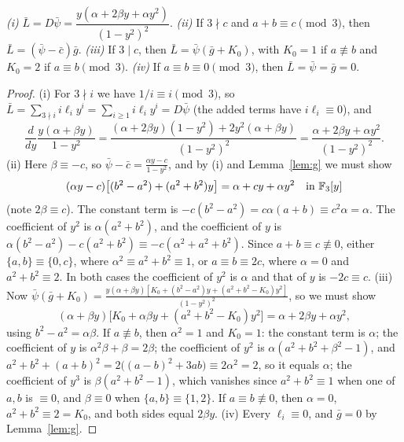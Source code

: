 \documentclass[11pt]{amsart}
\begin{document}
\begin{lemma}\label{lem:F3id}
\emph{(i)} $\bar L=D\bar\psi=\dfrac{y(\alpha+2\beta y+\alpha y^2)}{(1-y^2)^2}$.
\emph{(ii)} If $3\nmid c$ and $a+b\equiv c\pmod3$, then $\bar L=(\bar\psi-\bar c)\bar g$.
\emph{(iii)} If $3\mid c$, then $\bar L=\bar\psi(\bar g+K_0)$, with $K_0=1$ if $a\not\equiv b$ and $K_0=2$ if $a\equiv b\pmod 3$.
\emph{(iv)} If $a\equiv b\equiv0\pmod3$, then $\bar L=\bar\psi=\bar g=0$.
\end{lemma}
\begin{proof}
(i) For $3\nmid i$ we have $1/i\equiv i\pmod3$, so $\bar L=\sum_{3\nmid i}i\ell_iy^i=\sum_{i\ge1}i\ell_iy^i=D\bar\psi$ (the added terms have $i\ell_i\equiv0$), and
\[ \frac d{dy}\frac{y(\alpha+\beta y)}{1-y^2}=\frac{(\alpha+2\beta y)(1-y^2)+2y^2(\alpha+\beta y)}{(1-y^2)^2}=\frac{\alpha+2\beta y+\alpha y^2}{(1-y^2)^2}. \]
(ii) Here $\beta\equiv-c$, so $\bar\psi-\bar c=\frac{\alpha y-c}{1-y^2}$, and by (i) and Lemma~\ref{lem:g} we must show
\[ (\alpha y-c)\bigl[(b^2-a^2)+(a^2+b^2)y\bigr]=\alpha+cy+\alpha y^2\quad\text{in }\mathbb{F}_3[y] \]
(note $2\beta\equiv c$). The constant term is $-c(b^2-a^2)=c\alpha(a+b)\equiv c^2\alpha=\alpha$. The coefficient of $y^2$ is $\alpha(a^2+b^2)$, and the coefficient of $y$ is $\alpha(b^2-a^2)-c(a^2+b^2)\equiv-c(\alpha^2+a^2+b^2)$. Since $a+b\equiv c\not\equiv0$, either $\{a,b\}\equiv\{0,c\}$, where $\alpha^2\equiv a^2+b^2\equiv1$, or $a\equiv b\equiv2c$, where $\alpha=0$ and $a^2+b^2\equiv2$. In both cases the coefficient of $y^2$ is $\alpha$ and that of $y$ is $-2c\equiv c$.
(iii) Now $\bar\psi(\bar g+K_0)=\frac{y(\alpha+\beta y)[K_0+(b^2-a^2)y+(a^2+b^2-K_0)y^2]}{(1-y^2)^2}$, so we must show
\[ (\alpha+\beta y)\bigl[K_0+\alpha\beta y+(a^2+b^2-K_0)y^2\bigr]=\alpha+2\beta y+\alpha y^2, \]
using $b^2-a^2=\alpha\beta$. If $a\not\equiv b$, then $\alpha^2=1$ and $K_0=1$: the constant term is $\alpha$; the coefficient of $y$ is $\alpha^2\beta+\beta=2\beta$; the coefficient of $y^2$ is $\alpha(a^2+b^2+\beta^2-1)$, and $a^2+b^2+(a+b)^2=2\bigl((a-b)^2+3ab\bigr)\equiv2\alpha^2=2$, so it equals $\alpha$; the coefficient of $y^3$ is $\beta(a^2+b^2-1)$, which vanishes since $a^2+b^2\equiv1$ when one of $a,b$ is $\equiv0$, and $\beta\equiv0$ when $\{a,b\}\equiv\{1,2\}$. If $a\equiv b\not\equiv0$, then $\alpha=0$, $a^2+b^2\equiv2=K_0$, and both sides equal $2\beta y$. (iv) Every $\ell_i\equiv0$, and $\bar g=0$ by Lemma~\ref{lem:g}.
\end{proof}
\end{document}
